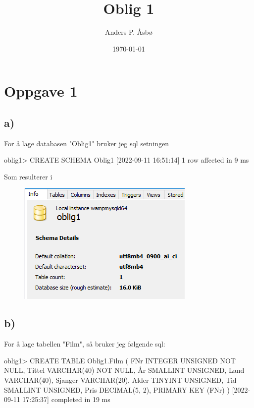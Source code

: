 \documentclass[%
notitlepage,
 amsmath,amssymb,
 aps,
rmp,
]{revtex4-2}  %
\begin{document}
\title{Oblig 1}   %
\author{Anders P. Åsbø}               %
\date{\today}                             %
\noaffiliation                            %

\maketitle                                %

\section*{Oppgave 1}
\subsection*{a)}
For å lage databasen "Oblig1" bruker jeg sql setningen
\begin{sql}
oblig1> CREATE SCHEMA Oblig1
[2022-09-11 16:51:14] 1 row affected in 9 ms
\end{sql}
Som resulterer i
\begin{figure}[H]
\centering\includegraphics[scale=1]{op1a.png}
\end{figure}

\subsection*{b)}
For å lage tabellen "Film", så bruker jeg følgende sql:
\begin{sql}
oblig1> CREATE TABLE Oblig1.Film (
            FNr INTEGER UNSIGNED NOT NULL,
            Tittel VARCHAR(40) NOT NULL,
            År SMALLINT UNSIGNED,
            Land VARCHAR(40),
            Sjanger VARCHAR(20),
            Alder TINYINT UNSIGNED,
            Tid SMALLINT UNSIGNED,
            Pris DECIMAL(5, 2),
            PRIMARY KEY (FNr)
        )
[2022-09-11 17:25:37] completed in 19 ms
\end{sql}
\end{document}
